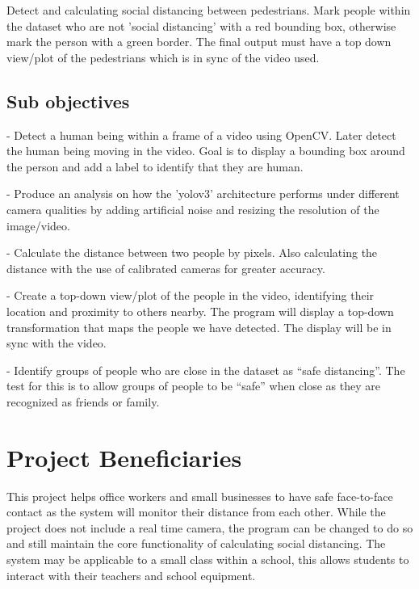 \documentclass[12pt]{report}
\begin{document}
Detect and calculating social distancing between pedestrians. Mark people within the dataset who are not 'social distancing' with a red bounding box, otherwise mark the person with a green border. The final output must have a top down view/plot of the pedestrians which is in sync of the video used.

\subsection{Sub objectives}

 - Detect a human being within a frame of a video using OpenCV. Later detect the human being moving in the video. Goal is to display a bounding box around the person and add a label to identify that they are human.

\vspace{2mm}

 - Produce an analysis on how the 'yolov3' architecture performs under different camera qualities by adding artificial noise and resizing the resolution of the image/video. 

\vspace{2mm}

 - Calculate the distance between two people by pixels. Also calculating the distance with the use of calibrated cameras for greater accuracy.

\vspace{2mm}

 - Create a top-down view/plot of the people in the video, identifying their location and proximity to others nearby. The program will display a top-down transformation that maps the people we have detected. The display will be in sync with the video.

\vspace{2mm}

 - Identify groups of people who are close in the dataset as “safe distancing”. The test for this is to allow groups of people to be “safe” when close as they are recognized as friends or family.


\section{Project Beneficiaries}

This project helps office workers and small businesses to have safe face-to-face contact as the system will monitor their distance from each other. While the project does not include a real time camera, the program can be changed to do so and still maintain the core functionality of calculating social distancing. The system may be applicable to a small class within a school, this allows students to interact with their teachers and school equipment.
\end{document}
